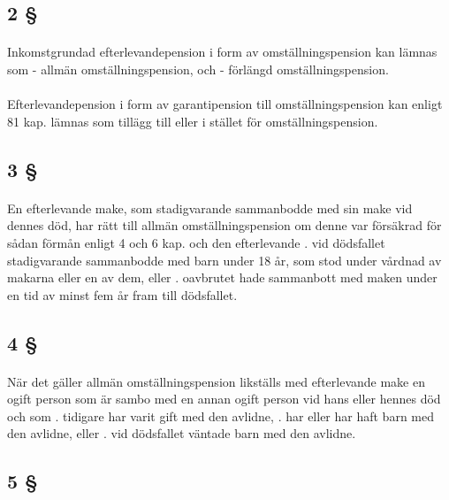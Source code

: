 \documentclass[a4paper,notitlepage,openany,10pt]{book}
\begin{document}
\subsection*{2 §}
\paragraph*{}
Inkomstgrundad efterlevandepension i form av omställningspension kan lämnas som
\newline - allmän omställningspension, och
\newline - förlängd omställningspension.
\paragraph*{}
Efterlevandepension i form av garantipension till omställningspension kan enligt 81 kap. lämnas som tillägg till eller i stället för omställningspension.
\subsection*{3 §}
\paragraph*{}
En efterlevande make, som stadigvarande sammanbodde med sin make vid dennes död, har rätt till allmän omställningspension om denne var försäkrad för sådan förmån enligt 4 och 6 kap. och den efterlevande
. vid dödsfallet stadigvarande sammanbodde med barn under 18 år, som stod under vårdnad av makarna eller en av dem, eller
. oavbrutet hade sammanbott med maken under en tid av minst fem år fram till dödsfallet.
\subsection*{4 §}
\paragraph*{}
När det gäller allmän omställningspension likställs med efterlevande make en ogift person som är sambo med en annan ogift person vid hans eller hennes död och som
. tidigare har varit gift med den avlidne,
. har eller har haft barn med den avlidne, eller
. vid dödsfallet väntade barn med den avlidne.
\subsection*{5 §}
\end{document}
